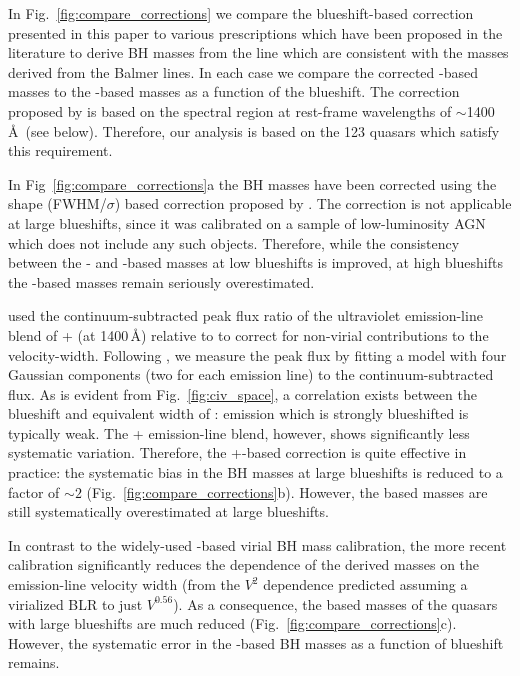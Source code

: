 In Fig.~\ref{fig:compare_corrections} we compare the  blueshift-based correction presented in this paper to various prescriptions which have been proposed in the literature to derive BH masses from the  line which are consistent with the masses derived from the Balmer lines. 
In each case we compare the corrected -based masses to the \hans-based masses as a function of the  blueshift. 
The correction proposed by \citet{runnoe13} is based on the spectral region at rest-frame wavelengths of $\sim$1400\,\AA \ (see below). 
Therefore, our analysis is based on the 123 quasars which satisfy this requirement. 

In Fig~\ref{fig:compare_corrections}a the  BH masses have been corrected using the  shape (FWHM/$\sigma$) based correction proposed by \citet{denney12}. 
The correction is not applicable at large  blueshifts, since it was calibrated on a sample of low-luminosity AGN which does not include any such objects.
Therefore, while the consistency between the \hans- and -based masses at low  blueshifts is improved, at high  blueshifts the -based masses remain seriously overestimated.

\citet{runnoe13} used the continuum-subtracted peak flux ratio of the ultraviolet emission-line blend of + (at 1400\,\AA) relative to  to correct for non-virial contributions to the  velocity-width. 
Following \citet{runnoe13}, we measure the peak flux by fitting a model with four Gaussian components (two for each emission line) to the continuum-subtracted flux.
As is evident from Fig.~\ref{fig:civ_space}, a correlation exists between the blueshift and equivalent width of :  emission which is strongly blueshifted is typically weak. 
The + emission-line blend, however, shows significantly less systematic variation. 
Therefore, the +-based correction is quite effective in practice: the systematic bias in the  BH masses at large  blueshifts is reduced to a factor of $\sim2$ (Fig.~\ref{fig:compare_corrections}b).
However, the  based masses are still systematically overestimated at large  blueshifts. 

In contrast to the widely-used \citet{vestergaard06} -based virial BH mass calibration, the more recent \citet{park13} calibration significantly reduces the dependence of the derived masses on the emission-line velocity width (from the $V^2$ dependence predicted assuming a virialized BLR to just $V^{0.56}$).
As a consequence, the  based masses of the quasars with large  blueshifts are much reduced (Fig.~\ref{fig:compare_corrections}c).
However, the systematic error in the -based BH masses as a function of  blueshift remains. 

